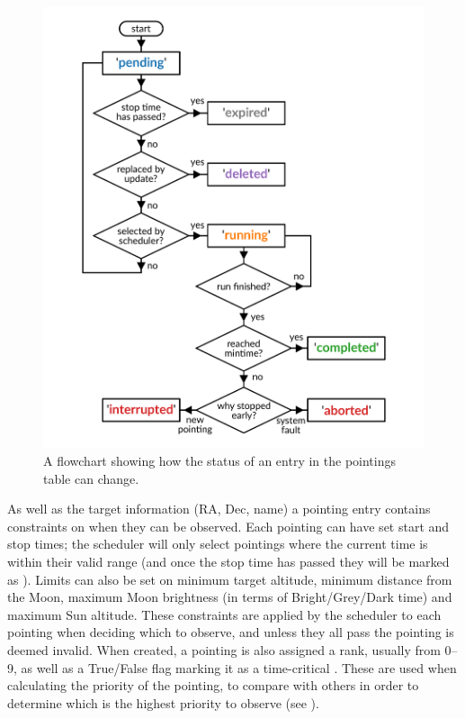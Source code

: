 \begin{colsection}
\begin{colsection}
\begin{figure}[p]
    \begin{center}
        \includegraphics[width=\linewidth]{images/pointings_flowchart.pdf}
    \end{center}
    \caption[Pointing status progression flowchart]{
        A flowchart showing how the status of an entry in the pointings table can change.
    }\label{fig:pointings}
\end{figure}

As well as the target information (RA, Dec, name) a pointing entry contains constraints on when they can be observed. Each pointing can have set start and stop times; the scheduler will only select pointings where the current time is within their valid range (and once the stop time has passed they will be marked as ). Limits can also be set on minimum target altitude, minimum distance from the Moon, maximum Moon brightness (in terms of Bright/Grey/Dark time) and maximum Sun altitude. These constraints are applied by the scheduler to each pointing when deciding which to observe, and unless they all pass the pointing is deemed invalid. When created, a pointing is also assigned a rank, usually from 0--9, as well as a True/False flag marking it as a time-critical . These are used when calculating the priority of the pointing, to compare with others in order to determine which is the highest priority to observe (see ).


\end{colsection}
\end{colsection}

